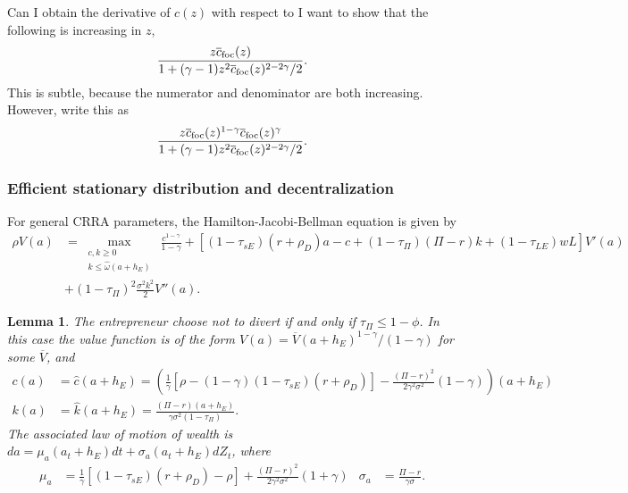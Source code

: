 \documentclass[11pt]{article}
\theoremstyle{plain}
\newtheorem{lemma}[thm]{Lemma}
\theoremstyle{definition} %
\begin{document}
Can I obtain the derivative of $c(z)$ with respect to 
I want to show that the following is increasing in $z$, 
$$
\frac{z\overline{c}_{\textnormal{foc}}(z)}{1 + (\gamma - 1) z^2\overline{c}_{\textnormal{foc}}(z)^{2-2\gamma}/2}.
$$
This is subtle, because the numerator and denominator are both increasing. However, write this as 
$$
\frac{z\overline{c}_{\textnormal{foc}}(z)^{1-\gamma}\overline{c}_{\textnormal{foc}}(z)^{\gamma}}{1 + (\gamma - 1) z^2\overline{c}_{\textnormal{foc}}(z)^{2-2\gamma}/2}.
$$
\fi


\iffalse
Now write $\overline{\overline{z}}$ for the solution to 
$$
1 + \frac{(\overline{\omega}/z)^{1-\gamma}-1}{1-\gamma} - \frac{\gamma}{2} z^2(\overline{\omega}/z)^{2-2\gamma} = 0. 
$$
\fi


\iffalse
I write the policy functions in \eqref{cand2} as $\overline{c}(S, \overline{\omega})$ and $x(S, \overline{\omega})$, and write the drift in consumption as
\begin{equation} 
\mu_c(S,\overline{\omega}) := \rho {\left(\frac{1-\overline{c}(S, \overline{\omega})^{1-\gamma}}{1-\gamma} + \gamma x(S, \overline{\omega})^2/2\right)}.
\label{muCRRA}
\end{equation}
\fi

\subsubsection{Efficient stationary distribution and decentralization} \label{decent}

For general CRRA parameters, the Hamilton-Jacobi-Bellman equation is given by
\begin{align*}
\rho V(a) & = \max_{\substack{c, k \geq 0 \\ k \leq \hat{\omega}(a+h_E) } } \ \frac{c^{1-\gamma}}{1-\gamma} + {\left[(1-\tau_{sE})(r + \rho_D)a - c + (1 - \tau_{\Pi})(\Pi - r)k + (1-\tau_{LE})wL\right]}V'(a)
\\ & + (1-\tau_{\Pi})^2\frac{\sigma^2k^2}{2} V''(a) .
\end{align*}

\begin{lemma}\label{CRRAap}
The entrepreneur choose not to divert if and only if $\tau_{\Pi} \leq 1 - \phi$. In this case the value function is of the form $V(a) = \overline{V}(a+h_E)^{1-\gamma}/(1-\gamma)$ for some $\overline{V}$, and
\begin{align*} 
c(a) & = \hat{c}(a+h_E) = {\left(\frac{1}{\gamma} [\rho -  (1-\gamma)(1-\tau_{sE})(r+\rho_D)] - \frac{(\Pi - r)^2}{2\gamma^2\sigma^2} (1-\gamma)\right)}(a+h_E)
\\ k(a) & = \hat{k}(a+h_E) = \frac{(\Pi-r)(a+h_E)}{\gamma \sigma^2(1-\tau_{\Pi})}.
\end{align*}
The associated law of motion of wealth is $da = \mu_a(a_t+h_E)dt + \sigma_a(a_t+h_E)dZ_t$, where
\begin{align*}
\mu_a & = \frac{1}{\gamma}[(1 - \tau_{sE})(r + \rho_D) - \rho] + \frac{(\Pi - r)^2}{2\gamma^2\sigma^2}(1+\gamma)  &
\sigma_a & = \frac{\Pi - r}{\gamma \sigma}.
\end{align*}
\end{lemma}
\end{document}
